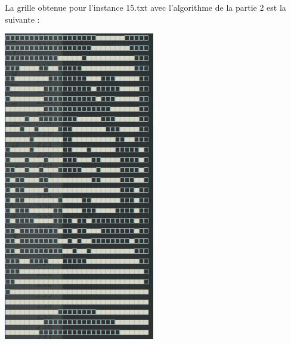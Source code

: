 \documentclass[12pt]{article}
\begin{document}
				La grille obtenue pour l'instance 15.txt avec l'algorithme de la partie 2 est la suivante :
				\begin{center}
					\includegraphics[scale=0.4]{instance15-2.png}
				\end{center}
		
		
		
		
		
		
		
		
		
		
		
		
		
		
		
		
		
		
		
		
		
		
		
		
		
		
		
\end{document}
